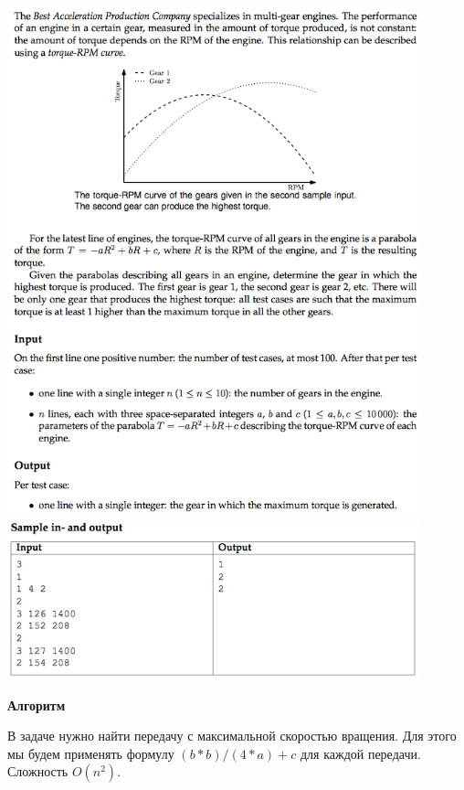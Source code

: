 \documentclass[a4paper,12pt]{article}
\begin{document}
\begin{center}
\includegraphics[width=0.9\textwidth]{CT_S02E08/CT_S02E08_G1.png}\\ [1cm]
\includegraphics[width=0.9\textwidth]{CT_S02E08/CT_S02E08_G2.png}\\ [1cm]
\end{center}

\textbf{{\large Алгоритм}}

В задаче нужно найти передачу с максимальной скоростью вращения. Для этого мы будем применять формулу $(b * b) / (4 * a) + c$ для каждой передачи. Сложность $O(n^2)$.\\
\end{document}

